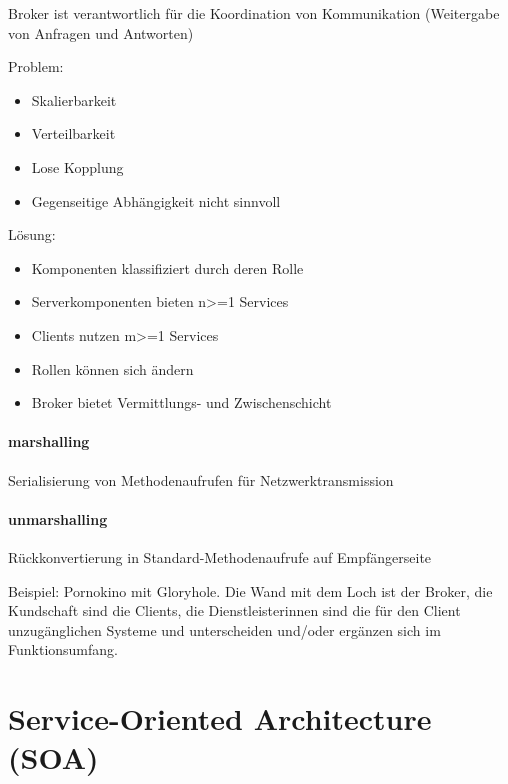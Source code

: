 Broker ist verantwortlich für die Koordination von Kommunikation
(Weitergabe von Anfragen und Antworten)

Problem:

\begin{itemize}
\itemsep1pt\parskip0pt
\item
  Skalierbarkeit
\item
  Verteilbarkeit
\item
  Lose Kopplung
\item
  Gegenseitige Abhängigkeit nicht sinnvoll
\end{itemize}

Lösung:

\begin{itemize}
\itemsep1pt\parskip0pt
\item
  Komponenten klassifiziert durch deren Rolle
\item
  Serverkomponenten bieten n\textgreater{}=1 Services
\item
  Clients nutzen m\textgreater{}=1 Services
\item
  Rollen können sich ändern
\item
  Broker bietet Vermittlungs- und Zwischenschicht
\end{itemize}

\paragraph{marshalling}\label{marshalling}

Serialisierung von Methodenaufrufen für Netzwerktransmission

\paragraph{unmarshalling}\label{unmarshalling}

Rückkonvertierung in Standard-Methodenaufrufe auf Empfängerseite

Beispiel: Pornokino mit Gloryhole. Die Wand mit dem Loch ist der Broker,
die Kundschaft sind die Clients, die Dienstleisterinnen sind die für den
Client unzugänglichen Systeme und unterscheiden und/oder ergänzen sich
im Funktionsumfang.

\section{Service-Oriented Architecture
(SOA)}\label{service-oriented-architecture-soa}

